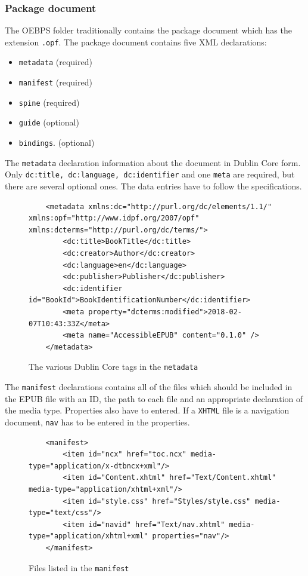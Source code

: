 \subsubsection{Package document}

The OEBPS folder traditionally contains the package document which has the extension \lstinline{.opf}. The package document contains five XML declarations:

\begin{itemize}
	\item \lstinline{metadata} (required)
	\item \lstinline{manifest} (required)
	\item \lstinline{spine} (required)
	\item \lstinline{guide} (optional)
	\item \lstinline{bindings}. (optional)
\end{itemize}

The \lstinline{metadata} declaration information about the document in Dublin Core form. Only \lstinline{dc:title, dc:language, dc:identifier} and one \lstinline{meta} are required, but there are several optional ones. The data entries have to follow the specifications. 

\begin{figure}
	\begin{lstlisting}
	<metadata xmlns:dc="http://purl.org/dc/elements/1.1/" xmlns:opf="http://www.idpf.org/2007/opf" xmlns:dcterms="http://purl.org/dc/terms/">
		<dc:title>BookTitle</dc:title>
		<dc:creator>Author</dc:creator>
		<dc:language>en</dc:language>
		<dc:publisher>Publisher</dc:publisher>
		<dc:identifier id="BookId">BookIdentificationNumber</dc:identifier>
		<meta property="dcterms:modified">2018-02-07T10:43:33Z</meta>
		<meta name="AccessibleEPUB" content="0.1.0" />
	</metadata>
	\end{lstlisting}
	\caption{The various Dublin Core tags in the \lstinline{metadata}}
	\label{fig:metadata}
\end{figure}

The \lstinline{manifest} declarations contains all of the files which should be included in the EPUB file with an ID, the path to each file and an appropriate declaration of the media type.  Properties also have to entered. If a \lstinline{XHTML} file is a navigation document, \lstinline{nav} has to be entered in the properties.

\begin{figure}
	\begin{lstlisting}
	<manifest>
		<item id="ncx" href="toc.ncx" media-type="application/x-dtbncx+xml"/>
		<item id="Content.xhtml" href="Text/Content.xhtml" media-type="application/xhtml+xml"/>
		<item id="style.css" href="Styles/style.css" media-type="text/css"/>
		<item id="navid" href="Text/nav.xhtml" media-type="application/xhtml+xml" properties="nav"/>
	</manifest>
	\end{lstlisting}
	\caption{Files listed in the \lstinline{manifest}}
	\label{fig:manifest}
\end{figure}

